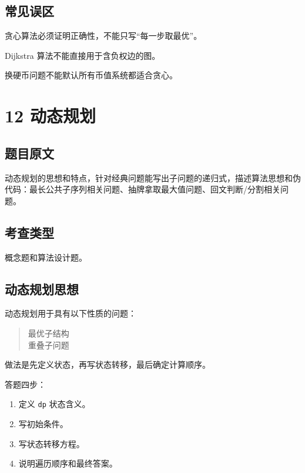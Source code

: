 \documentclass[UTF8,zihao=-4]{ctexart}
\begin{document}
\subsection*{常见误区}

贪心算法必须证明正确性，不能只写“每一步取最优”。

Dijkstra 算法不能直接用于含负权边的图。

换硬币问题不能默认所有币值系统都适合贪心。

\newpage

\section*{12 动态规划}

\subsection*{题目原文}

动态规划的思想和特点，针对经典问题能写出子问题的递归式，描述算法思想和伪代码：最长公共子序列相关问题、抽牌拿取最大值问题、回文判断/分割相关问题。

\subsection*{考查类型}

概念题和算法设计题。

\subsection*{动态规划思想}

动态规划用于具有以下性质的问题：

\begin{quote}
\small\ttfamily\raggedright
\relax 最优子结构\\
\relax 重叠子问题\\
\end{quote}

做法是先定义状态，再写状态转移，最后确定计算顺序。

答题四步：

\begin{enumerate}
\item 定义 \texttt{dp} 状态含义。
\item 写初始条件。
\item 写状态转移方程。
\item 说明遍历顺序和最终答案。
\end{enumerate}
\end{document}
